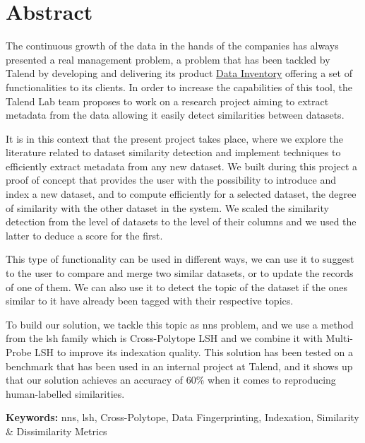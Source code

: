 \chapter*{Abstract}

The continuous growth of the data in the hands of the companies has always
presented a real management problem, a problem that has been tackled by Talend
by developing and delivering its product
\href{https://www.talend.com/products/data-inventory/}{Data Inventory} offering
a set of functionalities to its clients. In order to increase the capabilities
of this tool, the Talend Lab team proposes to work on a research project aiming
to extract metadata from the data allowing it easily detect similarities
between datasets. 

It is in this context that the present project takes place, where we explore the
literature related to dataset similarity detection and implement techniques to
efficiently extract metadata from any new dataset. We built during this project
a proof of concept that provides the user with the possibility to introduce and
index a new dataset, and to compute efficiently for a selected dataset, the
degree of similarity with the other dataset in the system. We scaled the
similarity detection from the level of datasets to the level of their columns
and we used the latter to deduce a score for the first.

This type of functionality can be used in different ways, we can use it to
suggest to the user to compare and merge two similar datasets, or to update the
records of one of them. We can also use it to detect the topic of the dataset if
the ones similar to it have already been tagged with their respective topics.

To build our solution, we tackle this topic as \acrfull{nns} problem, and we use
a method from the \acrfull{lsh} family which is Cross-Polytope LSH and we
combine it with Multi-Probe LSH to improve its indexation quality. This solution
has been tested on a benchmark that has been used in an internal project at
Talend, and it shows up that our solution achieves an accuracy of 60\% when it
comes to reproducing human-labelled similarities.

\vspace{2cm}
\textbf{Keywords:}
\acrlong{nns}, \acrlong{lsh}, Cross-Polytope, Data Fingerprinting, Indexation,
Similarity \& Dissimilarity Metrics